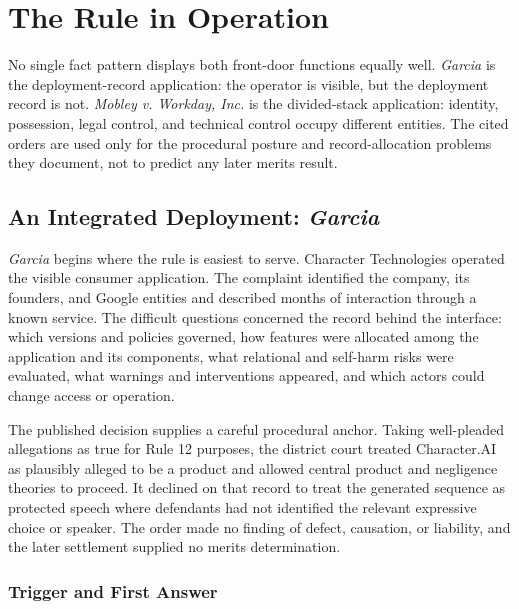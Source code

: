 \section{The Rule in Operation}
\label{sec:applications}

No single fact pattern displays both front-door functions equally well. \emph{Garcia} is the deployment-record application: the operator is visible, but the deployment record is not. \emph{Mobley v. Workday, Inc.} is the divided-stack application: identity, possession, legal control, and technical control occupy different entities. The cited orders are used only for the procedural posture and record-allocation problems they document, not to predict any later merits result.

\subsection{An Integrated Deployment: \emph{Garcia}}
\label{sec:garcia-application}

\emph{Garcia} begins where the rule is easiest to serve. Character Technologies operated the visible consumer application. The complaint identified the company, its founders, and Google entities and described months of interaction through a known service. The difficult questions concerned the record behind the interface: which versions and policies governed, how features were allocated among the application and its components, what relational and self-harm risks were evaluated, what warnings and interventions appeared, and which actors could change access or operation.

The published decision supplies a careful procedural anchor. Taking well-pleaded allegations as true for Rule 12 purposes, the district court treated Character.AI as plausibly alleged to be a product and allowed central product and negligence theories to proceed. It declined on that record to treat the generated sequence as protected speech where defendants had not identified the relevant expressive choice or speaker. The order made no finding of defect, causation, or liability, and the later settlement supplied no merits determination.

\subsubsection{Trigger and First Answer}

